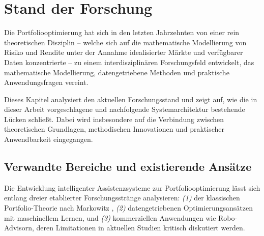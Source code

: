 



\chapter{Stand der Forschung}
\label{chap:stand_der_forschung}


  Die Portfoliooptimierung hat sich in den letzten Jahrzehnten von einer rein theoretischen Disziplin -- welche sich auf die mathematische Modellierung von Risiko und Rendite unter der Annahme idealisierter Märkte und verfügbarer Daten konzentrierte -- zu einem interdisziplinären Forschungsfeld entwickelt, das mathematische Modellierung, datengetriebene Methoden und praktische Anwendungsfragen vereint.

  Dieses Kapitel analysiert den aktuellen Forschungsstand und zeigt auf, wie die in dieser Arbeit vorgeschlagene und nachfolgende Systemarchitektur bestehende Lücken schließt.
  Dabei wird insbesondere auf die Verbindung zwischen theoretischen Grundlagen, methodischen Innovationen und praktischer Anwendbarkeit eingegangen.

\section{Verwandte Bereiche und existierende Ansätze}

  Die Entwicklung intelligenter Assistenzsysteme zur Portfoliooptimierung lässt sich entlang dreier etablierter Forschungsstränge analysieren:
  \textit{(1)} der klassischen Portfolio-Theorie nach Markowitz \autocite{markowitz1952},
  \textit{(2)} datengetriebenen Optimierungsansätzen mit maschinellem Lernen,
  und \textit{(3)} kommerziellen Anwendungen wie Robo-Advisorn, deren Limitationen in aktuellen Studien kritisch diskutiert werden.

